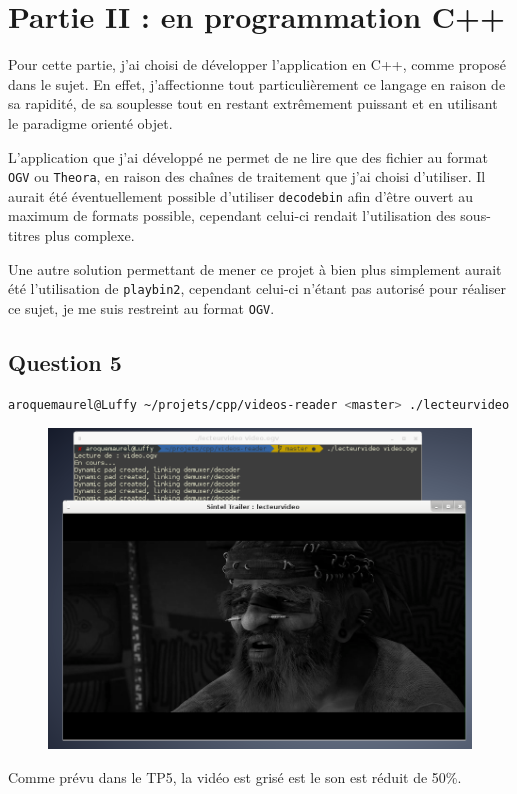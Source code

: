 \documentclass[a4paper, 11pt]{article}
\begin{document}
	\section{Partie II : en programmation C++}
	Pour cette partie, j'ai choisi de développer l'application en C++, comme proposé dans le sujet. En effet, j'affectionne tout particulièrement ce langage en
	raison de sa rapidité, de sa souplesse tout en restant extrêmement puissant et en utilisant le paradigme orienté objet.

	L'application que j'ai développé ne permet de ne lire que des fichier au format \texttt{OGV} ou \texttt{Theora}, en raison des chaînes de traitement que j'ai
	choisi d'utiliser. Il aurait été éventuellement possible d'utiliser \texttt{decodebin} afin d'être ouvert au maximum de formats possible, cependant celui-ci
	rendait l'utilisation des sous-titres plus complexe.

	Une autre solution permettant de mener ce projet à bien plus simplement aurait été l'utilisation de \texttt{playbin2}, cependant celui-ci n'étant pas
	autorisé pour réaliser ce sujet, je me suis restreint au format \texttt{OGV}.

	\subsection{Question 5}
	\begin{lstlisting}[language=sh]
 aroquemaurel@Luffy ~/projets/cpp/videos-reader <master> ./lecteurvideo video.ogv 
	\end{lstlisting}
	\begin{figure}[H]
		\centering
		\includegraphics[width=17cm]{img/1.png}
	\end{figure}
	Comme prévu dans le TP5, la vidéo est grisé est le son est réduit de 50\%. 
\end{document}

